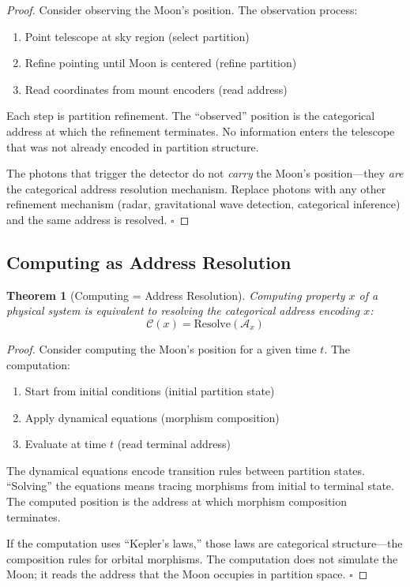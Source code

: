 \documentclass[twocolumn,10pt]{article}
\newtheorem{theorem}{Theorem}[section]
\theoremstyle{definition}
\theoremstyle{remark}
\newcommand{\Comp}{\mathcal{C}}
\begin{document}
\begin{proof}
Consider observing the Moon's position. The observation process:
\begin{enumerate}
    \item Point telescope at sky region (select partition)
    \item Refine pointing until Moon is centered (refine partition)
    \item Read coordinates from mount encoders (read address)
\end{enumerate}

Each step is partition refinement. The ``observed'' position is the categorical address at which the refinement terminates. No information enters the telescope that was not already encoded in partition structure.

The photons that trigger the detector do not \emph{carry} the Moon's position---they \emph{are} the categorical address resolution mechanism. Replace photons with any other refinement mechanism (radar, gravitational wave detection, categorical inference) and the same address is resolved. $\square$
\end{proof}

\subsection{Computing as Address Resolution}

\begin{theorem}[Computing = Address Resolution]
\label{thm:comp}
Computing property $x$ of a physical system is equivalent to resolving the categorical address encoding $x$:
\begin{equation}
\Comp(x) = \text{Resolve}(\mathcal{A}_x)
\end{equation}
\end{theorem}

\begin{proof}
Consider computing the Moon's position for a given time $t$. The computation:
\begin{enumerate}
    \item Start from initial conditions (initial partition state)
    \item Apply dynamical equations (morphism composition)
    \item Evaluate at time $t$ (read terminal address)
\end{enumerate}

The dynamical equations encode transition rules between partition states. ``Solving'' the equations means tracing morphisms from initial to terminal state. The computed position is the address at which morphism composition terminates.

If the computation uses ``Kepler's laws,'' those laws are categorical structure---the composition rules for orbital morphisms. The computation does not simulate the Moon; it reads the address that the Moon occupies in partition space. $\square$
\end{proof}
\end{document}
